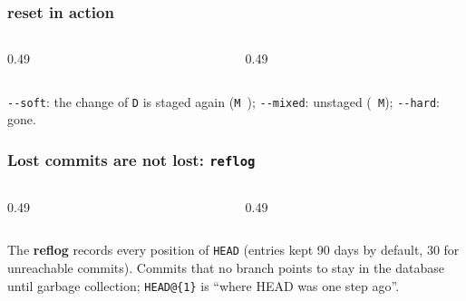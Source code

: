\documentclass[aspectratio=169,10pt,compress]{beamer}
\begin{document}
\begin{frame}[t,fragile] \frametitle{reset in action}
  \begin{columns}[T]
    \begin{column}{0.49\textwidth}
    \end{column}
    \begin{column}{0.49\textwidth}
    \end{column}
  \end{columns}

  \vspace{0.1em}
  \small
  \texttt{-{}-soft}: the change of \texttt{D} is staged again (\texttt{M\ }); \texttt{-{}-mixed}: unstaged (\texttt{\ M}); \texttt{-{}-hard}: gone.
\end{frame}




\begin{frame}[t,fragile] \frametitle{Lost commits are not lost: \texttt{reflog}}
  \begin{columns}[T]
    \begin{column}{0.49\textwidth}
    \end{column}
    \begin{column}{0.49\textwidth}
    \end{column}
  \end{columns}

  \vspace{0.1em}
  \small
  The \textbf{reflog} records every position of \texttt{HEAD} (entries kept 90 days by default, 30 for unreachable commits). Commits that no branch points to stay in the database until
  garbage collection; \texttt{HEAD@\{1\}} is ``where HEAD was one step ago''.
\end{frame}
\end{document}
